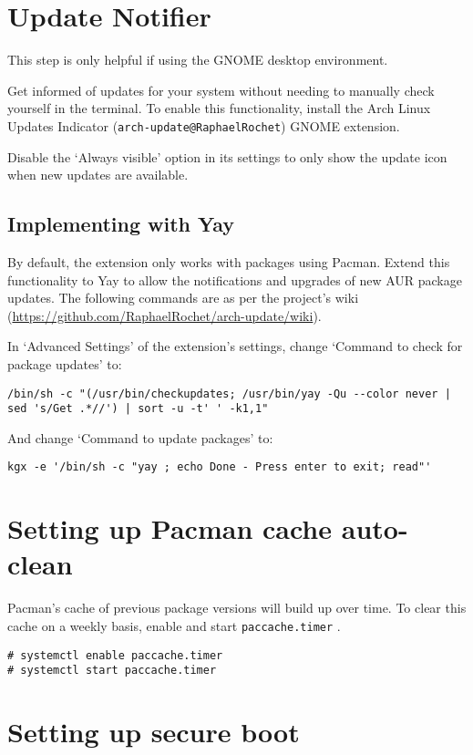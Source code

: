 \documentclass[a4paper]{article}
\begin{document}
\section{Update Notifier}

This step is only helpful if using the GNOME desktop environment.

Get informed of updates for your system without needing to manually check yourself in the terminal.
To enable this functionality, install the Arch Linux Updates Indicator (\lstinline|arch-update@RaphaelRochet|) GNOME extension.

Disable the `Always visible' option in its settings to only show the update icon when new updates are available.

\subsection*{Implementing with Yay}

By default, the extension only works with packages using Pacman.
Extend this functionality to Yay to allow the notifications and upgrades of new AUR package updates.
The following commands are as per the project's wiki (\url{https://github.com/RaphaelRochet/arch-update/wiki}).

In `Advanced Settings' of the extension's settings, change `Command to check for package updates' to:
\begin{lstlisting}
/bin/sh -c "(/usr/bin/checkupdates; /usr/bin/yay -Qu --color never | sed 's/Get .*//') | sort -u -t' ' -k1,1"
\end{lstlisting}
And change `Command to update packages' to:
\begin{lstlisting}
kgx -e '/bin/sh -c "yay ; echo Done - Press enter to exit; read"'
\end{lstlisting}

\section{Setting up Pacman cache auto-clean}

Pacman's cache of previous package versions will build up over time.
To clear this cache on a weekly basis, enable and start \lstinline|paccache.timer| \cite{paccache-timer}.

\begin{lstlisting}
# systemctl enable paccache.timer
# systemctl start paccache.timer
\end{lstlisting}

\section{Setting up secure boot}
\end{document}
